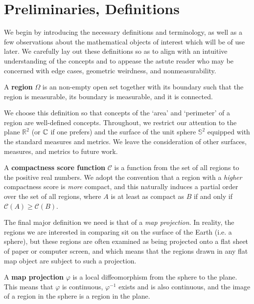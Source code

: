 \section{Preliminaries, Definitions}\label{sec:prelims}

We begin by introducing the necessary definitions and terminology, as
well as a few observations about the mathematical objects of interest
which will be of use later.  We carefully lay out these definitions so
as to align with an intuitive understanding of the concepts and to
appease the astute reader who may be concerned with edge cases,
geometric weirdness, and nonmeasurability.

\begin{definition}
A \textbf{region} $\Omega$ is an non-empty open set together with its
boundary such that the region is measurable, its boundary is
measurable, and it is connected.
\end{definition}

We choose this definition so that concepts of the `area' and
`perimeter' of a region are well-defined concepts.  Throughout, we
restrict our attention to the plane $\mathbb{R}^2$ (or $\mathbb{C}$ if one
prefers) and the surface of the unit sphere $\mathbb{S}^2$ equipped
with the standard measures and metrics.  We leave the consideration of
other surfaces, measures, and metrics to future work.

\begin{definition}
A \textbf{compactness score function} $\mathcal{C}$ is a function from
the set of all regions to the positive real numbers.  We adopt the
convention that a region with a \textit{higher} compactness score is
\textit{more} compact, and this naturally induces a partial order over
the set of all regions, where $A$ is at least as compact as $B$ if and
only if $\mathcal{C}(A)\geq \mathcal{C}(B)$.
\end{definition}

The final major definition we need is that of a \textit{map
projection}.  In reality, the regions we are interested in comparing
sit on the surface of the Earth (i.e. a sphere), but these regions are
often examined as being projected onto a flat sheet of paper or
computer screen, and which means that the regions drawn in any flat
map object are subject to such a projection.

\begin{definition}
A \textbf{map projection} $\varphi$ is a local diffeomorphism from the
sphere to the plane.  This means that $\varphi$ is continuous,
$\varphi^{-1}$ exists and is also continuous, and the image of a
region in the sphere is a region in the plane.
\end{definition}

